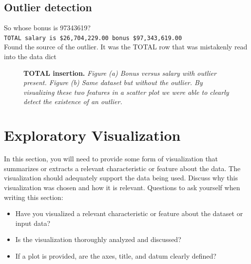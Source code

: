 \documentclass[twoside,openright,titlepage,numbers=noenddot,headinclude,%
               footinclude=true,cleardoublepage=empty,abstractoff,BCOR=5mm,%
               paper=a4,fontsize=11pt,ngerman,american]{scrreprt}
\numberwithin{theorem}{chapter}
\numberwithin{definition}{chapter}
\numberwithin{algorithm}{chapter}
\numberwithin{figure}{chapter}
\numberwithin{table}{chapter}
\numberwithin{equation}{chapter}
\begin{document}
\subsection*{Outlier detection}
So whose bonus is 97343619?\\
\texttt{TOTAL salary is  \$26,704,229.00 bonus \$97,343,619.00}\\
Found the source of the outlier. It was the TOTAL row that was mistakenly read into the data dict
\begin{figure}[!hbtp]
\centering
    
    \caption{\textbf{TOTAL insertion.} \textit{Figure (a) Bonus versus salary with outlier present. Figure (b) Same dataset but without the outlier. By visualizing these two features in a scatter plot we were able to clearly detect the existence of an outlier.}}
\end{figure}




\section*{Exploratory Visualization}

In this section, you will need to provide some form of visualization that summarizes or extracts a relevant characteristic or feature about the data. The visualization should adequately support the data being used. Discuss why this visualization was chosen and how it is relevant. Questions to ask yourself when writing this section:
\begin{itemize}%
\item Have you visualized a relevant characteristic or feature about the dataset or input data?
\item Is the visualization thoroughly analyzed and discussed?
\item If a plot is provided, are the axes, title, and datum clearly defined?
\end{itemize}
\end{document}
